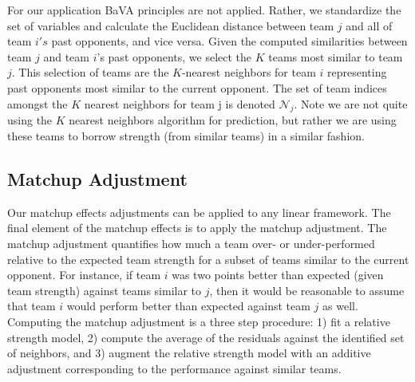 \documentclass[letterpaper,12pt]{article}
\begin{document}
For our application BaVA principles are not applied. Rather, we standardize the set of variables and calculate the Euclidean distance between team $j$ and all of team $i's$ past opponents, and vice versa. Given the computed similarities between team $j$ and team $i$'s past opponents, we select the $K$ teams most similar to team $j$. This selection of teams are the $K$-nearest neighbors for team $i$ representing past opponents most similar to the current opponent. The set of team indices amongst the $K$ nearest neighbors for team j is denoted $\mathcal{N}_j$. Note we are not quite using the $K$ nearest neighbors algorithm for prediction, but rather we are using these teams to borrow strength (from similar teams) in a similar fashion.

\subsection{Matchup Adjustment}
Our matchup effects adjustments can be applied to any linear framework. The final element of the matchup effects is to apply the matchup adjustment. The matchup adjustment quantifies how much a team over- or under-performed relative to the expected team strength for a subset of teams similar to the current opponent. For instance, if team $i$ was two points better than expected (given team strength) against teams similar to $j$, then it would be reasonable to assume that team $i$ would perform better than expected against team $j$ as well. Computing the matchup adjustment is a three step procedure: 1) fit a relative strength model, 2) compute the average of the residuals against the identified set of neighbors, and 3) augment the relative strength model with an additive adjustment corresponding to the performance against similar teams.
\end{document}
